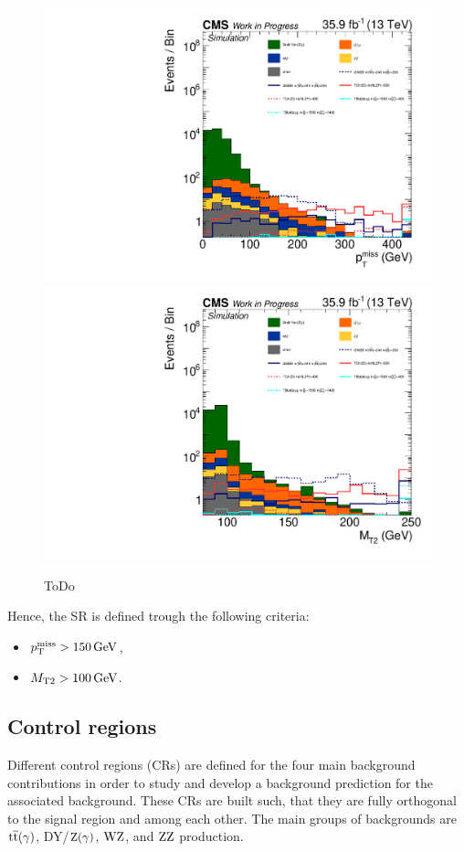 \begin{figure}[htb]
 \centering
 \includegraphics[width=\pairwidth]{figures/mt2/onZ_LL_met_log}
 \includegraphics[width=\pairwidth]{figures/mt2/onZ_LL_mt2_log}
 \caption{ToDo}
 \label{fig:SRvariables}
\end{figure}
Hence, the SR is defined trough the following criteria:
\begin{itemize}
 \item $p_{\mathrm{T}}^\text{miss}>150\,\text{Ge\hspace{-.08em}V}$,
 \item $M_{\mathrm{T2}}>100\,\text{Ge\hspace{-.08em}V}$.
\end{itemize}
\subsection{Control regions}
Different control regions (CRs) are defined for the four main background contributions in order to study and develop a background prediction for the associated background. These CRs are built such, that they are fully orthogonal to the signal region and among each other. The main groups of backgrounds are ${\mathrm{t}\overline{\mathrm{t}}}(\gamma)$, DY/$\mathrm{Z}(\gamma)$, $\mathrm{W}\mathrm{Z}$, and $\mathrm{Z}\mathrm{Z}$ production.

